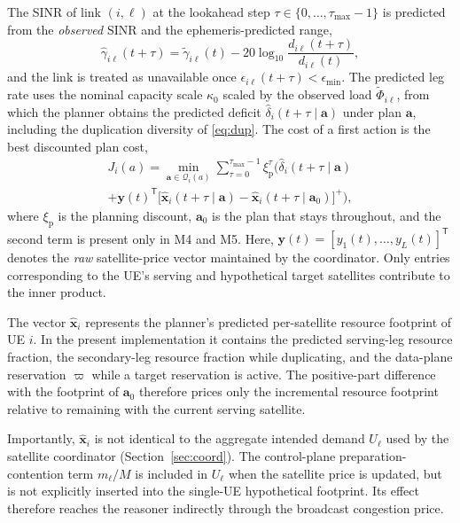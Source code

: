 \documentclass[journal]{IEEEtran}
\begin{document}
The SINR of link $(i,\ell)$ at the lookahead step
$\tau\in\{0,\dots,\tau_{\max}-1\}$ is predicted from the \emph{observed} SINR
and the ephemeris-predicted range,
\begin{equation}
\hat\gamma_{i\ell}(t+\tau)=\tilde\gamma_{i\ell}(t)-20\log_{10}\frac{d_{i\ell}(t+\tau)}{d_{i\ell}(t)},
\end{equation}
and the link is treated as unavailable once $\epsilon_{i\ell}(t+\tau)<\epsilon_{\min}$.
The predicted leg rate uses the nominal capacity scale $\kappa_0$ scaled by the
observed load $\tilde\Phi_{i\ell}$, from which the planner obtains the
predicted deficit $\hat\delta_i(t+\tau\mid\mathbf{a})$ under plan
$\mathbf{a}$, including the duplication diversity of \eqref{eq:dup}. The cost
of a first action is the best discounted plan cost,
\begin{multline}
J_i(a)=\min_{\mathbf{a}\in\mathcal{Q}_i(a)}\sum_{\tau=0}^{\tau_{\max}-1}\xi_{\mathrm{p}}^\tau\Big(\hat\delta_i(t+\tau\mid\mathbf{a})\\
+\mathbf{y}(t)^{\mathsf T}\big[\hat{\mathbf{x}}_i(t+\tau\mid\mathbf{a})-\hat{\mathbf{x}}_i(t+\tau\mid\mathbf{a}_0)\big]^+\Big),
\label{eq:plancost}
\end{multline}
where $\xi_{\mathrm{p}}$ is the planning discount, $\mathbf{a}_0$ is the plan
that stays throughout, and the second term is present only in M4 and M5. Here,
$\mathbf{y}(t)=[y_1(t),\ldots,y_L(t)]^{\mathsf T}$ denotes the \emph{raw}
satellite-price vector maintained by the coordinator. Only entries
corresponding to the UE's serving and hypothetical target satellites contribute
to the inner product.

The vector $\hat{\mathbf{x}}_i$ represents the planner's predicted
per-satellite resource footprint of UE $i$. In the present implementation it
contains the predicted serving-leg resource fraction, the secondary-leg
resource fraction while duplicating, and the data-plane reservation $\varpi$
while a target reservation is active. The positive-part difference with the
footprint of $\mathbf{a}_0$ therefore prices only the incremental resource
footprint relative to remaining with the current serving satellite.

Importantly, $\hat{\mathbf{x}}_i$ is not identical to the aggregate intended
demand $U_\ell$ used by the satellite coordinator (Section~\ref{sec:coord}).
The control-plane preparation-contention term $m_\ell/M$ is included in
$U_\ell$ when the satellite price is updated, but is not explicitly inserted
into the single-UE hypothetical footprint. Its effect therefore reaches the
reasoner indirectly through the broadcast congestion price.
\end{document}
